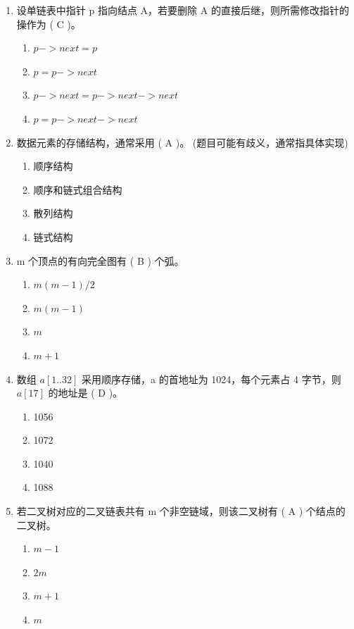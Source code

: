 \documentclass[12pt, a4paper]{article}
\begin{document}
\begin{enumerate}[label=\arabic*.]
    \item 设单链表中指针 p 指向结点 A，若要删除 A 的直接后继，则所需修改指针的操作为 ( C )。
    \begin{enumerate}
        \item $p->next = p$
        \item $p = p->next$
        \item $p->next = p->next->next$
        \item $p = p->next->next$
    \end{enumerate}

    \item 数据元素的存储结构，通常采用 ( A )。 (题目可能有歧义，通常指具体实现)
    \begin{enumerate}
        \item 顺序结构
        \item 顺序和链式组合结构
        \item 散列结构
        \item 链式结构
    \end{enumerate}

    \item m 个顶点的有向完全图有 ( B ) 个弧。
    \begin{enumerate}
        \item $m(m-1)/2$
        \item $m(m-1)$
        \item $m$
        \item $m+1$
    \end{enumerate}

    \item 数组 $a[1..32]$ 采用顺序存储，a 的首地址为 1024，每个元素占 4 字节，则 $a[17]$ 的地址是 ( D )。
    \begin{enumerate}
        \item 1056
        \item 1072
        \item 1040
        \item 1088
    \end{enumerate}

    \item 若二叉树对应的二叉链表共有 m 个非空链域，则该二叉树有 ( A ) 个结点的二叉树。
    \begin{enumerate}
        \item $m-1$ 
        \item $2m$
        \item $m+1$
        \item $m$
    \end{enumerate}


\end{enumerate}
\end{document}
